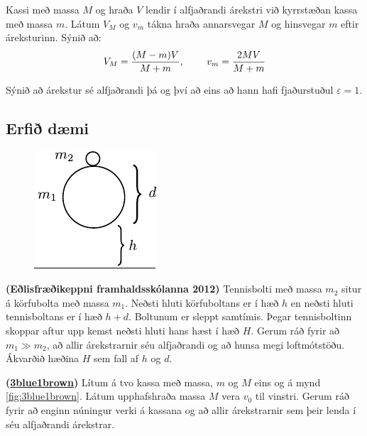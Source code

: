 \begin{enumerate}[label = \textbf{Dæmi \thechapter.\arabic*.}]
\item Kassi með massa $M$ og hraða $V$ lendir í alfjaðrandi árekstri við kyrrstæðan kassa með massa $m$. Látum $V_M$ og $v_m$ tákna hraða annarsvegar $M$ og hinsvegar $m$ eftir áreksturinn. Sýnið að:
\begin{align*}
    V_M = \frac{(M-m)V}{M+m}, \hspace{0.8cm} v_m = \frac{2MV}{M + m}
\end{align*}

\item Sýnið að árekstur sé alfjaðrandi þá og því að eins að hann hafi fjaðurstuðul $\varepsilon = 1$.

\newpage

\subsection*{Erfið dæmi}

\begin{minipage}{\linewidth}
\begin{figure}
\centering
\vspace{-1cm}
\includegraphics{figures/highflying.pdf}
   \label{fig:ipho1966}
\end{figure}

\item \textbf{(Eðlisfræðikeppni framhaldsskólanna 2012)} Tennisbolti með massa $m_2$ situr á körfubolta með massa $m_1$. Neðsti hluti körfuboltans er í hæð $h$ en neðsti hluti tennisboltans er í hæð $h + d$. Boltunum er sleppt samtímis. Þegar tennisboltinn skoppar aftur upp kemst neðsti hluti hans hæst í hæð $H$. Gerum ráð fyrir að $m_1 \gg m_2$, að allir árekstrarnir séu alfjaðrandi og að hunsa megi loftmótstöðu. Ákvarðið hæðina $H$ sem fall af $h$ og $d$.
\end{minipage}

\vspace{0.5cm}

\item \textbf{(\href{https://youtu.be/HEfHFsfGXjs}{3blue1brown})} Lítum á tvo kassa með massa, $m$ og $M$ eins og á mynd \ref{fig:3blue1brown}. Látum upphafshraða massa $M$ vera $v_0$ til vinstri. Gerum ráð fyrir að enginn núningur verki á kassana og að allir árekstrarnir sem þeir lenda í séu alfjaðrandi árekstrar.


\end{enumerate}
